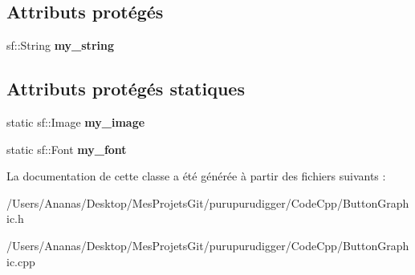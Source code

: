 \subsection*{Attributs protégés}
\begin{DoxyCompactItemize}
\item 
\hypertarget{class_button_graphic_a5c0fc023a5c6856ca1f87a5a7601f24c}{sf\-::\-String {\bfseries my\-\_\-string}}\label{class_button_graphic_a5c0fc023a5c6856ca1f87a5a7601f24c}

\end{DoxyCompactItemize}
\subsection*{Attributs protégés statiques}
\begin{DoxyCompactItemize}
\item 
\hypertarget{class_button_graphic_a6ebb6c74733ac73702df072afbb684fc}{static sf\-::\-Image {\bfseries my\-\_\-image}}\label{class_button_graphic_a6ebb6c74733ac73702df072afbb684fc}

\item 
\hypertarget{class_button_graphic_aebc358786eeb35bf58959c62fc1bfa27}{static sf\-::\-Font {\bfseries my\-\_\-font}}\label{class_button_graphic_aebc358786eeb35bf58959c62fc1bfa27}

\end{DoxyCompactItemize}


La documentation de cette classe a été générée à partir des fichiers suivants \-:\begin{DoxyCompactItemize}
\item 
/\-Users/\-Ananas/\-Desktop/\-Mes\-Projets\-Git/purupurudigger/\-Code\-Cpp/Button\-Graphic.\-h\item 
/\-Users/\-Ananas/\-Desktop/\-Mes\-Projets\-Git/purupurudigger/\-Code\-Cpp/Button\-Graphic.\-cpp\end{DoxyCompactItemize}
